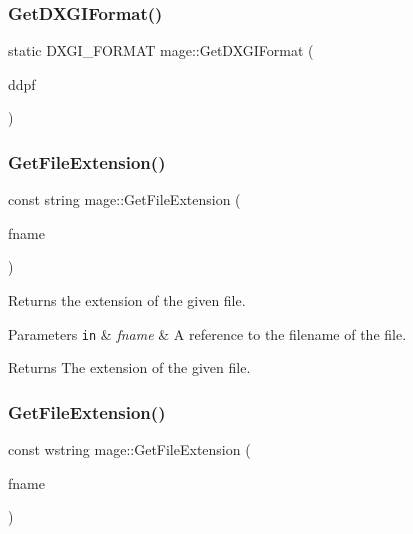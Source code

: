 \subsubsection{\texorpdfstring{Get\+D\+X\+G\+I\+Format()}{GetDXGIFormat()}}
{\footnotesize\ttfamily static D\+X\+G\+I\+\_\+\+F\+O\+R\+M\+AT mage\+::\+Get\+D\+X\+G\+I\+Format (\begin{DoxyParamCaption}\item[{const \hyperlink{structmage_1_1_d_d_s___p_i_x_e_l_f_o_r_m_a_t}{D\+D\+S\+\_\+\+P\+I\+X\+E\+L\+F\+O\+R\+M\+AT} \&}]{ddpf }\end{DoxyParamCaption})\hspace{0.3cm}{\ttfamily [static]}}

\hypertarget{namespacemage_a4da638506a9dda4f16c41a1a00c0d0e1}{}\label{namespacemage_a4da638506a9dda4f16c41a1a00c0d0e1} 
\subsubsection{\texorpdfstring{Get\+File\+Extension()}{GetFileExtension()}\hspace{0.1cm}{\footnotesize\ttfamily [1/2]}}
{\footnotesize\ttfamily const string mage\+::\+Get\+File\+Extension (\begin{DoxyParamCaption}\item[{const string \&}]{fname }\end{DoxyParamCaption})}

Returns the extension of the given file.


\begin{DoxyParams}[1]{Parameters}
\mbox{\tt in}  & {\em fname} & A reference to the filename of the file. \\
\hline
\end{DoxyParams}
\begin{DoxyReturn}{Returns}
The extension of the given file. 
\end{DoxyReturn}
\hypertarget{namespacemage_a2818c96634f4c8d49dcc4144395b24ef}{}\label{namespacemage_a2818c96634f4c8d49dcc4144395b24ef} 
\subsubsection{\texorpdfstring{Get\+File\+Extension()}{GetFileExtension()}\hspace{0.1cm}{\footnotesize\ttfamily [2/2]}}
{\footnotesize\ttfamily const wstring mage\+::\+Get\+File\+Extension (\begin{DoxyParamCaption}\item[{const wstring \&}]{fname }\end{DoxyParamCaption})}

